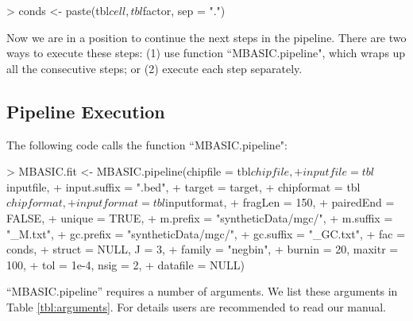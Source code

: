 \documentclass[a4paper,10pt]{article}
\begin{document}
\begin{Schunk}
\begin{Sinput}
> conds <- paste(tbl$cell, tbl$factor, sep = ".")
\end{Sinput}
\end{Schunk}

Now we are in a position to continue the next steps in the pipeline. There are two ways to execute these steps: (1) use function ``MBASIC.pipeline", which wraps up all the consecutive steps; or (2) execute each step separately.

\subsection{Pipeline Execution}

The following code calls the function ``MBASIC.pipeline":

\begin{Schunk}
\begin{Sinput}
> MBASIC.fit <- MBASIC.pipeline(chipfile = tbl$chipfile,
+                               inputfile = tbl$inputfile,
+                               input.suffix = ".bed",
+                               target = target,
+                               chipformat = tbl$chipformat,
+                               inputformat = tbl$inputformat,
+                               fragLen = 150,
+                               pairedEnd = FALSE,
+                               unique = TRUE,
+                               m.prefix = "syntheticData/mgc/",
+                               m.suffix = "_M.txt",
+                               gc.prefix = "syntheticData/mgc/",
+                               gc.suffix = "_GC.txt",
+                               fac = conds,
+                               struct = NULL, J = 3,
+                               family = "negbin",
+                               burnin = 20, maxitr = 100,
+                               tol = 1e-4, nsig = 2,
+                               datafile = NULL)
\end{Sinput}
\end{Schunk}

``MBASIC.pipeline'' requires a number of arguments. We list these arguments in Table \ref{tbl:arguments}. For details users are recommended to read our manual.
\end{document}
